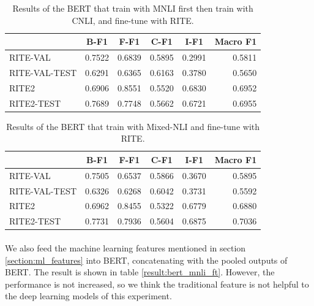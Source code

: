 \documentclass{article}
\begin{document}
\begin{CJK*}{UTF8}{bkai}
\begin{table}[ht!]
  \centering
  \begin{tabular}{|l|r|r|r|r|r|}
  \hline
   & \multicolumn{1}{c|}{B-F1} & \multicolumn{1}{c|}{F-F1} & \multicolumn{1}{c|}{C-F1} & \multicolumn{1}{c|}{I-F1} & \multicolumn{1}{c|}{Macro F1} \\ \hline
  RITE-VAL & 0.7522 & 0.6839 & 0.5895 & 0.2991 & 0.5811 \\ \hline
  RITE-VAL-TEST & 0.6291 & 0.6365 & 0.6163 & 0.3780 & 0.5650 \\ \hline
  RITE2 & 0.6906 & 0.8551 & 0.5520 & 0.6830 & 0.6952 \\ \hline
  RITE2-TEST & 0.7689 & 0.7748 & 0.5662 & 0.6721 & 0.6955 \\ \hline
  \end{tabular}
  \caption{Results of the BERT that train with MNLI first then train with CNLI, and fine-tune with RITE.}
  \label{result:bert_mnli_cnli}
\end{table}

\begin{table}[ht!]
  \centering
  \begin{tabular}{|l|r|r|r|r|r|}
  \hline
   & \multicolumn{1}{c|}{B-F1} & \multicolumn{1}{c|}{F-F1} & \multicolumn{1}{c|}{C-F1} & \multicolumn{1}{c|}{I-F1} & \multicolumn{1}{c|}{Macro F1} \\ \hline
  RITE-VAL & 0.7505 & 0.6537 & 0.5866 & 0.3670 & 0.5895 \\ \hline
  RITE-VAL-TEST & 0.6326 & 0.6268 & 0.6042 & 0.3731 & 0.5592 \\ \hline
  RITE2 & 0.6962 & 0.8455 & 0.5322 & 0.6779 & 0.6880 \\ \hline
  RITE2-TEST & 0.7731 & 0.7936 & 0.5604 & 0.6875 & 0.7036 \\ \hline
  \end{tabular}
  \caption{Results of the BERT that train with Mixed-NLI and fine-tune with RITE.}
  \label{result:bert_mixed_nli}
\end{table}

\paragraph{}
We also feed the machine learning features mentioned in section \ref{section:ml_features} into BERT, concatenating with the pooled outputs of BERT. The result is shown in table \ref{result:bert_mnli_ft}. However, the performance is not increased, so we think the traditional feature is not helpful to the deep learning models of this experiment.


\end{CJK*}
\end{document}

